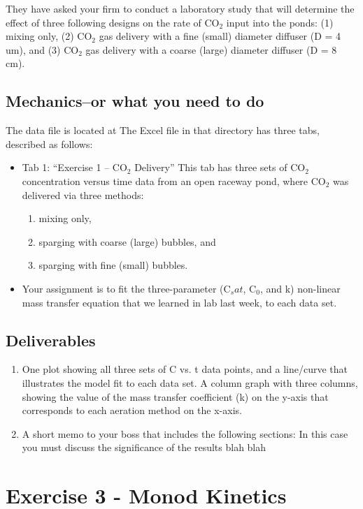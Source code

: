 \documentclass[12pt,letterpaper]{article}
\begin{document}
They have asked your firm to conduct a laboratory study that will determine the effect of three following designs  on the rate of CO$_2$ input into the ponds: (1) mixing only, (2) CO$_2$ gas delivery with a fine (small) diameter diffuser (D = 4 um), and (3) CO$_2$ gas delivery with a coarse (large) diameter diffuser (D = 8 cm).

\subsection *{Mechanics--or what you need to do}
The data file is located at %
The Excel file in that directory has three tabs, described as follows:
\begin{itemize}

\item Tab 1: “Exercise 1 – CO$_2$ Delivery”  This tab has three sets of CO$_2$ concentration versus time data from an open raceway pond, where  CO$_2$ was delivered via three methods:

\begin{enumerate}

\item mixing only, 
\item sparging with coarse (large) bubbles, and 
\item sparging with fine (small) bubbles.
\end{enumerate} 
\item Your assignment is to fit the three-parameter (C$_sat$, C$_0$, and k) non-linear mass transfer equation that we learned in lab last week, to each data set.
\end{itemize}

\subsection *{Deliverables}
\begin{enumerate}
\item One plot showing all three sets of C vs. t data points, and a line/curve that illustrates the model fit to each data set.
A column graph with three columns, showing the value of the mass transfer coefficient (k) on the y-axis that corresponds to each aeration method on the x-axis.
\item A short memo to your boss that includes the following sections:  In this case you must discuss the significance of the results blah blah
\end{enumerate}




\section *{Exercise 3 - Monod Kinetics}
\end{document}

